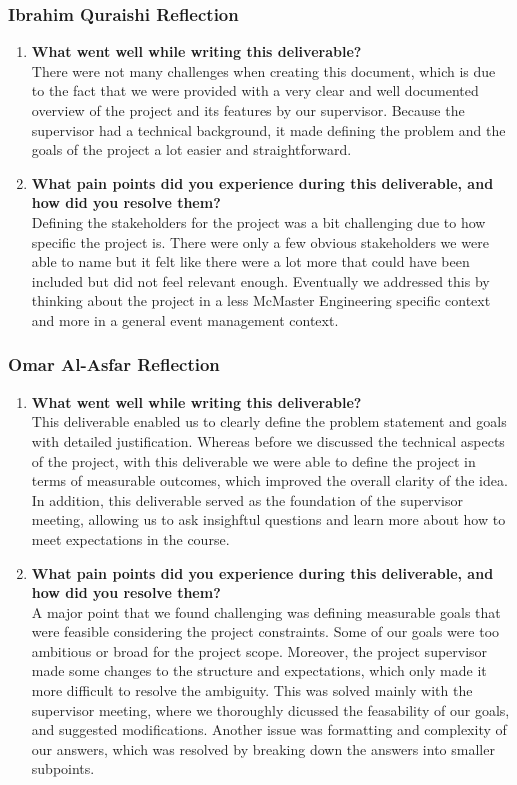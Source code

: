 \documentclass{article}
\begin{document}
\subsubsection*{Ibrahim Quraishi Reflection}
\begin{enumerate}
    \item \textbf{What went well while writing this deliverable? } \\
    There were not many challenges when creating this document, which is due to the fact that we were provided with a very clear and well documented overview of the project and its features by our supervisor. Because the supervisor had a technical background, it made defining the problem and the goals of the project a lot easier and straightforward. 
    \item \textbf{What pain points did you experience during this deliverable, and how did you resolve them?} \\ 
    Defining the stakeholders for the project was a bit challenging due to how specific the project is. There were only a few obvious stakeholders we were able to name but it felt like there were a lot more that could have been included but did not feel relevant enough. Eventually we addressed this by thinking about the project in a less McMaster Engineering specific context and more in a general event management context.
\end{enumerate}

\subsubsection*{Omar Al-Asfar Reflection}
\begin{enumerate}
    \item \textbf{What went well while writing this deliverable? } \\
    This deliverable enabled us to clearly define the problem statement and goals with detailed justification. Whereas before we discussed the technical aspects of the project, with this deliverable we were able to define the project in terms of measurable outcomes, which improved the overall clarity of the idea. In addition, this deliverable served as the foundation of the supervisor meeting, allowing us to ask insighftul questions and learn more about how to meet expectations in the course.
    \item \textbf{What pain points did you experience during this deliverable, and how did you resolve them?} \\ 
    A major point that we found challenging was defining measurable goals that were feasible considering the project constraints. Some of our goals were too ambitious or broad for the project scope. Moreover, the project supervisor made some changes to the structure and expectations, which only made it more difficult to resolve the ambiguity. This was solved mainly with the supervisor meeting, where we thoroughly dicussed the feasability of our goals, and suggested modifications. Another issue was formatting and complexity of our answers, which was resolved by breaking down the answers into smaller subpoints.
\end{enumerate} 
\end{document}
